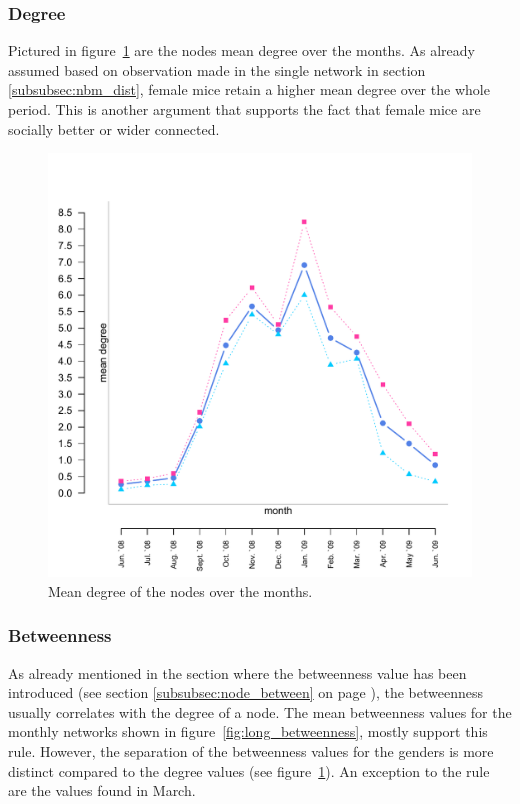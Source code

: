 \subsubsection{Degree}

Pictured in figure~\ref{fig:long_degree} are the nodes mean degree over the months. As already assumed based on observation made in the single network in section \ref{subsubsec:nbm_dist}, female mice retain a higher mean degree over the whole period. This is another argument that supports the fact that female mice are socially better or wider connected.

\begin{figure}[htpb]
\begin{center}
  \includegraphics[width=.6\textwidth]{assets/pdf/long_degree.pdf}
  \caption[Mean degree of the nodes over the months]{Mean degree of the nodes over the months.}
  \label{fig:long_degree}
\end{center}
\end{figure} 


\subsubsection{Betweenness}
\label{subsubsec:long_betweenness}

As already mentioned in the section where the betweenness value has been introduced (see section \ref{subsubsec:node_between} on page \pageref{subsubsec:node_between}), the betweenness usually correlates with the degree of a node. The mean betweenness values for the monthly networks shown in figure~\ref{fig:long_betweenness}, mostly support this rule. However, the separation of the betweenness values for the genders is more distinct compared to the degree values (see figure~\ref{fig:long_degree}). An exception to the rule are the values found in March.   

